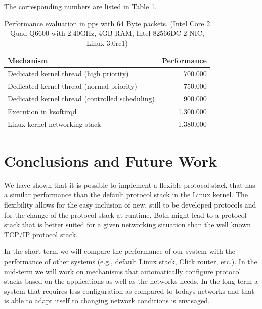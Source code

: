 \documentclass{sig-alternate}
\begin{document}
The corresponding numbers are listed in Table \ref{tab:performance}.
\begin{table}[htb]
\begin{tabular}{ l r }
Mechanism & Performance\\
\hline
Dedicated kernel thread (high priority) & 700.000\\
Dedicated kernel thread (normal priority) & 750.000\\
Dedicated kernel thread (controlled scheduling) & 900.000\\
Execution in ksoftirqd & 1.300.000\\
Linux kernel networking stack & 1.380.000\\
\end{tabular}
\caption{Performance evaluation in pps with 64 Byte packets.
(Intel Core 2 Quad Q6600 with 2.40GHz, 4GB RAM, Intel 82566DC-2 NIC, Linux 3.0rc1)}
\label{tab:performance}
\vspace{-0.15cm}
\end{table}

\vspace{-0.2cm}
\section{Conclusions and Future Work}
We have shown that it is possible to implement a flexible protocol stack that has a similar performance than the default protocol stack in the Linux kernel. The flexibility allows for the easy inclusion of new, still to be developed protocols and for the change of the protocol stack at runtime. Both might lead to a protocol stack that is better suited for a given networking situation than the well known TCP/IP protocol stack.

In the short-term we will compare the performance of our system with the performance of other systems (e.g., default Linux stack, Click router, etc.). 
In the mid-term we will work on mechanisms that automatically configure protocol stacks based on the applications as well as the networks needs. 
In the long-term a system that requires less configuration as compared to todays networks and that is able to adapt itself to changing network conditions is envisaged.   
\end{document}
